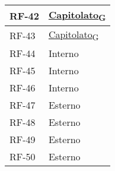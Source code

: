 \begin{longtable}{|>{\centering\arraybackslash}m{}|>{\centering\arraybackslash}m{}|}
	RF-42              & \href{https://7last.github.io/docs/rtb/documentazione-interna/glossario\#capitolato}{Capitolato\textsubscript{G}}                                                                                                                                    \\\hline
	RF-43              & \href{https://7last.github.io/docs/rtb/documentazione-interna/glossario\#capitolato}{Capitolato\textsubscript{G}}                                                                                                                                    \\\hline
	RF-44              & Interno                                                                                                                                                                                                                                              \\\hline
	RF-45              & Interno                                                                                                                                                                                                                                              \\\hline
	RF-46              & Interno                                                                                                                                                                                                                                              \\\hline
	RF-47              & Esterno                                                                                                                                                                                                                                              \\\hline
	RF-48              & Esterno                                                                                                                                                                                                                                              \\\hline
	RF-49              & Esterno                                                                                                                                                                                                                                              \\\hline
	RF-50              & Esterno                                                                                                                                                                                                                                              \\\hline

\end{longtable}
